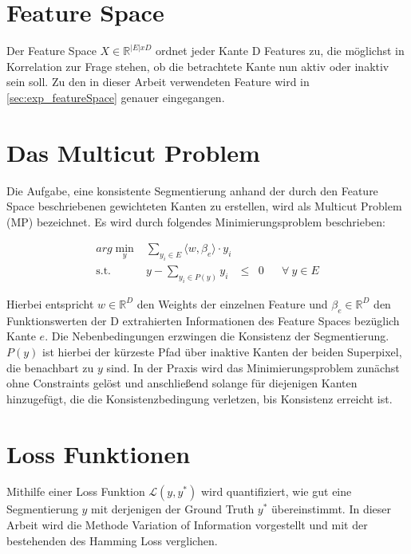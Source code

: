 \section{Feature Space}\label{sec:featureSpace}

Der Feature Space $X \in \mathbb{R}^{|E|xD}$ ordnet jeder Kante D Features zu, die möglichst in Korrelation zur Frage stehen, ob die betrachtete Kante nun aktiv oder inaktiv sein soll. Zu den in dieser Arbeit verwendeten Feature wird in \ref{sec:exp_featureSpace} genauer eingegangen.



\section{Das Multicut Problem}\label{sec:multicutProb}

Die Aufgabe, eine konsistente Segmentierung anhand der durch den Feature Space beschriebenen gewichteten Kanten zu erstellen, wird als Multicut Problem (MP) bezeichnet. Es wird durch folgendes Minimierungsproblem beschrieben: 


\begin{equation} 
\begin{array}{rrclcl}
\displaystyle arg \min_{y} & \sum\limits_{y_i \in E} \langle w, \beta_e \rangle \cdot y_i \\
\textrm{s.t.} &  y - \sum\limits_{y_i \in P(y)} y_i & \le & 0 & & \forall \ y \in E
\end{array}
\label{eq:mp}
\end{equation}


Hierbei entspricht $w \in \mathbb{R}^D$ den Weights der einzelnen Feature und $\beta_e \in \mathbb{R}^D$ den Funktionswerten der D extrahierten Informationen des Feature Spaces bezüglich Kante $e$. Die Nebenbedingungen erzwingen die Konsistenz der Segmentierung. $P(y)$ ist hierbei der kürzeste Pfad über inaktive Kanten der beiden Superpixel, die benachbart zu $y$ sind. In der Praxis wird das Minimierungsproblem zunächst ohne Constraints gelöst und anschließend solange für diejenigen Kanten hinzugefügt, die die Konsistenzbedingung verletzen, bis Konsistenz erreicht ist.

\section{Loss Funktionen}\label{sec:loss-fkts}

Mithilfe einer Loss Funktion $\mathcal{L}(y, y^*)$ wird quantifiziert, wie gut eine Segmentierung $y$ mit derjenigen der Ground Truth $y^*$ übereinstimmt. In dieser Arbeit wird die Methode Variation of Information vorgestellt und mit der bestehenden des Hamming Loss verglichen.

